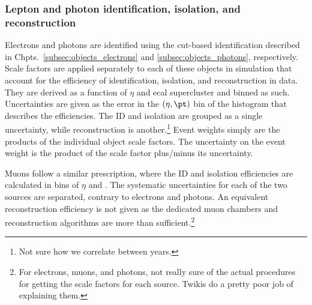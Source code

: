 

\subsubsection{Lepton and photon identification, isolation, and reconstruction}
\label{subsubsec:htoinv_lepton_id_iso_reco_systs}

Electrons and photons are identified using the cut-based identification described in Chpts.~\ref{subsec:objects_electrons} and \ref{subsec:objects_photons}, respectively. Scale factors are applied separately to each of these objects in simulation that account for the efficiency of identification, isolation, and reconstruction in data. They are derived as a function of $\eta$ and \acrshort{ecal} supercluster \pt and binned as such. Uncertainties are given as the error in the $(\eta, \pt)$ bin of the histogram that describes the efficiencies. The ID and isolation are grouped as a single uncertainty, while reconstruction is another.\footnote{Not sure how we correlate between years.} Event weights simply are the products of the individual object scale factors. The uncertainty on the event weight is the product of the scale factor plus/minus its uncertainty.



Muons follow a similar prescription, where the ID and isolation efficiencies are calculated in bins of $\eta$ and \pt. The systematic uncertainties for each of the two sources are separated, contrary to electrons and photons. An equivalent reconstruction efficiency is not given as the dedicated muon chambers and reconstruction algorithms are more than sufficient.\footnote{For electrons, muons, and photons, not really sure of the actual procedures for getting the scale factors for each source. Twikis do a pretty poor job of explaining them.}


